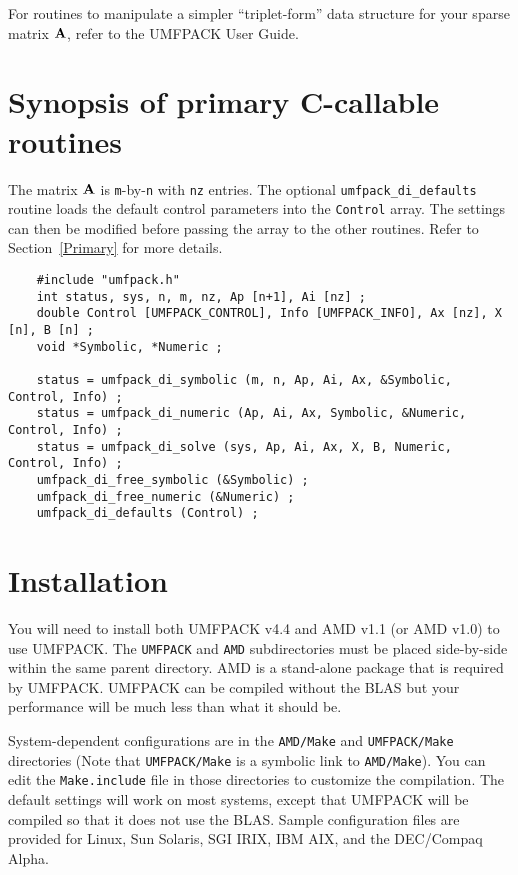 \documentclass[11pt]{article}
\newcommand{\m}[1]{{\bf{#1}}}       %
\begin{document}
For routines to manipulate a simpler ``triplet-form'' data structure for your
sparse matrix $\m{A}$, refer to the UMFPACK User Guide.

\section{Synopsis of primary C-callable routines}
\label{Synopsis}

The matrix $\m{A}$ is {\tt m}-by-{\tt n} with {\tt nz} entries.
The optional {\tt umfpack\_di\_defaults} routine loads the default control
parameters into the {\tt Control} array.  The settings can then be modified
before passing the array to the other routines.  Refer to Section~\ref{Primary}
for more details.

{\footnotesize
\begin{verbatim}
    #include "umfpack.h"
    int status, sys, n, m, nz, Ap [n+1], Ai [nz] ;
    double Control [UMFPACK_CONTROL], Info [UMFPACK_INFO], Ax [nz], X [n], B [n] ;
    void *Symbolic, *Numeric ;

    status = umfpack_di_symbolic (m, n, Ap, Ai, Ax, &Symbolic, Control, Info) ;
    status = umfpack_di_numeric (Ap, Ai, Ax, Symbolic, &Numeric, Control, Info) ;
    status = umfpack_di_solve (sys, Ap, Ai, Ax, X, B, Numeric, Control, Info) ;
    umfpack_di_free_symbolic (&Symbolic) ;
    umfpack_di_free_numeric (&Numeric) ;
    umfpack_di_defaults (Control) ;
\end{verbatim}
}

\section{Installation}
\label{Install}

You will need to install both UMFPACK v4.4 and AMD v1.1 (or AMD v1.0) to use UMFPACK.
The {\tt UMFPACK} and {\tt AMD} subdirectories must be placed side-by-side
within the same parent directory.  AMD is a stand-alone package that
is required by UMFPACK.  UMFPACK can be compiled without the
BLAS but your performance will be much less than what it should be.

System-dependent configurations are in the {\tt AMD/Make}
and {\tt UMFPACK/Make} directories
(Note that {\tt UMFPACK/Make} is a symbolic link to {\tt AMD/Make}).
You can edit the {\tt Make.include}
file in those directories to customize the compilation.  The default
settings will work on most systems, except that UMFPACK will be compiled so
that it does not use the BLAS.  Sample configuration files are provided
for Linux, Sun Solaris, SGI IRIX, IBM AIX, and the DEC/Compaq Alpha.
\end{document}
